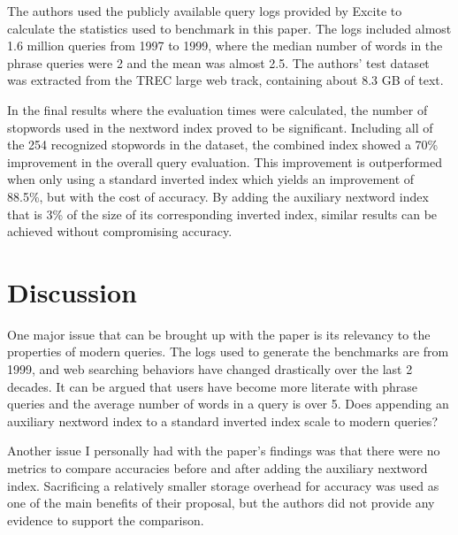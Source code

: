 \documentclass[11pt]{article}
\begin{document}
    The authors used the publicly available query logs provided by Excite to calculate the statistics used to benchmark in this paper. The logs included almost 1.6 million queries from 1997 to 1999, where the median number of words in the phrase queries were 2 and the mean was almost 2.5. The authors' test dataset was extracted from the TREC large web track, containing about 8.3 GB of text.

    In the final results where the evaluation times were calculated, the number of stopwords used in the nextword index proved to be significant. Including all of the 254 recognized stopwords in the dataset, the combined index showed a 70\% improvement in the overall query evaluation. This improvement is outperformed when only using a standard inverted index which yields an improvement of 88.5\%, but with the cost of accuracy. By adding the auxiliary nextword index that is 3\% of the size of its corresponding inverted index, similar results can be achieved without compromising accuracy. 

    \section*{Discussion}

    One major issue that can be brought up with the paper is its relevancy to the properties of modern queries. The logs used to generate the benchmarks are from 1999, and web searching behaviors have changed drastically over the last 2 decades. It can be argued that users have become more literate with phrase queries and the average number of words in a query is over 5. Does appending an auxiliary nextword index to a standard inverted index scale to modern queries?

    Another issue I personally had with the paper's findings was that there were no metrics to compare accuracies before and after adding the auxiliary nextword index. Sacrificing a relatively smaller storage overhead for accuracy was used as one of the main benefits of their proposal, but the authors did not provide any evidence to support the comparison. 
\end{document}
